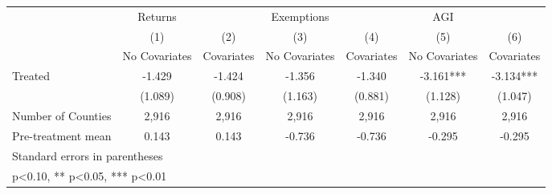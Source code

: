 {
\def\sym#1{\ifmmode^{#1}\else\(^{#1}\)\fi}
\begin{tabular}{l*{6}{c}}
\hline\hline
            &     Returns   &               &  Exemptions   &               &         AGI   &               \\
            &\multicolumn{1}{c}{(1)}&\multicolumn{1}{c}{(2)}&\multicolumn{1}{c}{(3)}&\multicolumn{1}{c}{(4)}&\multicolumn{1}{c}{(5)}&\multicolumn{1}{c}{(6)}\\
            &\multicolumn{1}{c}{No Covariates}&\multicolumn{1}{c}{Covariates}&\multicolumn{1}{c}{No Covariates}&\multicolumn{1}{c}{Covariates}&\multicolumn{1}{c}{No Covariates}&\multicolumn{1}{c}{Covariates}\\
\hline
Treated     &      -1.429   &      -1.424   &      -1.356   &      -1.340   &      -3.161***&      -3.134***\\
            &     (1.089)   &     (0.908)   &     (1.163)   &     (0.881)   &     (1.128)   &     (1.047)   \\
\hline
Number of Counties&       2,916   &       2,916   &       2,916   &       2,916   &       2,916   &       2,916   \\
Pre-treatment mean&       0.143   &       0.143   &      -0.736   &      -0.736   &      -0.295   &      -0.295   \\
\hline\hline
\multicolumn{7}{l}{\footnotesize Standard errors in parentheses}\\
\multicolumn{7}{l}{\footnotesize * p<0.10, ** p<0.05, *** p<0.01}\\
\end{tabular}
}
